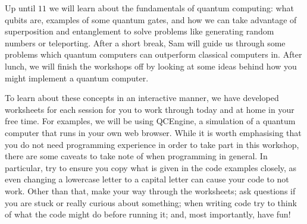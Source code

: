 \documentclass{article}
\begin{document}
Up until $11$ we will learn about the fundamentals of quantum computing: what qubits are, examples of some quantum gates, and how we can take advantage of superposition and entanglement to solve problems like generating random numbers or teleporting. After a short break, Sam will guide us through some problems which quantum computers can outperform classical computers in. After lunch, we will finish the workshops off by looking at some ideas behind how you might implement a quantum computer.

To learn about these concepts in an interactive manner, we have developed worksheets for each session for you to work through today and at home in your free time. For examples, we will be using QCEngine, a simulation of a quantum computer that runs in your own web browser. While it is worth emphasising that you do not need programming experience in order to take part in this workshop, there are some caveats to take note of when programming in general. In particular, try to ensure you copy what is given in the code examples closely, as even changing a lowercase letter to a capital letter can cause your code to not work. Other than that, make your way through the worksheets; ask questions if you are stuck or really curious about something; when writing code try to think of what the code might do before running it; and, most importantly, have fun!
\end{document}
